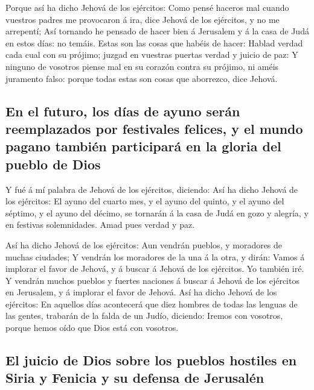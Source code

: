  Porque así ha dicho Jehová de los ejércitos: Como pensé
haceros mal cuando vuestros padres me provocaron á ira, dice Jehová de
los ejércitos, y no me arrepentí;  Así tornando he pensado
de hacer bien á Jerusalem y á la casa de Judá en estos días: no temáis.
 Estas son las cosas que habéis de hacer: Hablad verdad
cada cual con su prójimo; juzgad en vuestras puertas verdad y juicio de
paz:  Y ninguno de vosotros piense mal en su corazón contra
su prójimo, ni améis juramento falso: porque todas estas son cosas que
aborrezco, dice Jehová.

\hypertarget{en-el-futuro-los-duxedas-de-ayuno-seruxe1n-reemplazados-por-festivales-felices-y-el-mundo-pagano-tambiuxe9n-participaruxe1-en-la-gloria-del-pueblo-de-dios}{%
\subsection{En el futuro, los días de ayuno serán reemplazados por
festivales felices, y el mundo pagano también participará en la gloria
del pueblo de
Dios}\label{en-el-futuro-los-duxedas-de-ayuno-seruxe1n-reemplazados-por-festivales-felices-y-el-mundo-pagano-tambiuxe9n-participaruxe1-en-la-gloria-del-pueblo-de-dios}}

 Y fué á mí palabra de Jehová de los ejércitos, diciendo:
 Así ha dicho Jehová de los ejércitos: El ayuno del cuarto
mes, y el ayuno del quinto, y el ayuno del séptimo, y el ayuno del
décimo, se tornarán á la casa de Judá en gozo y alegría, y en festivas
solemnidades. Amad pues verdad y paz.

 Así ha dicho Jehová de los ejércitos: Aun vendrán pueblos,
y moradores de muchas ciudades;  Y vendrán los moradores de
la una á la otra, y dirán: Vamos á implorar el favor de Jehová, y á
buscar á Jehová de los ejércitos. Yo también iré.  Y
vendrán muchos pueblos y fuertes naciones á buscar á Jehová de los
ejércitos en Jerusalem, y á implorar el favor de Jehová. 
Así ha dicho Jehová de los ejércitos: En aquellos días acontecerá que
diez hombres de todas las lenguas de las gentes, trabarán de la falda de
un Judío, diciendo: Iremos con vosotros, porque hemos oído que Dios está
con vosotros.

\hypertarget{el-juicio-de-dios-sobre-los-pueblos-hostiles-en-siria-y-fenicia-y-su-defensa-de-jerusaluxe9n}{%
\subsection{El juicio de Dios sobre los pueblos hostiles en Siria y
Fenicia y su defensa de
Jerusalén}\label{el-juicio-de-dios-sobre-los-pueblos-hostiles-en-siria-y-fenicia-y-su-defensa-de-jerusaluxe9n}}

